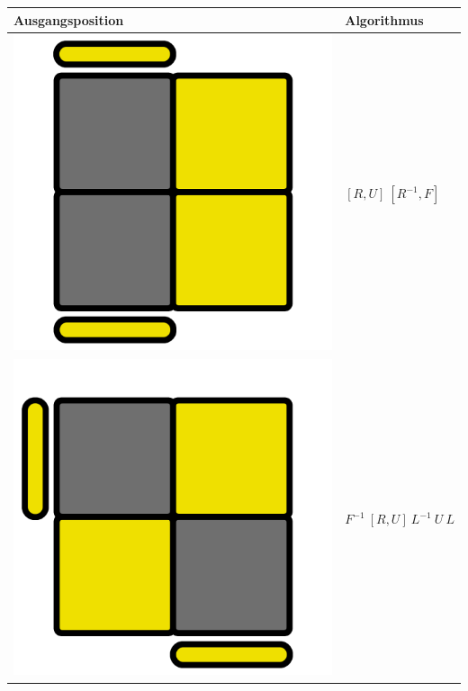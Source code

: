 \documentclass[12pt,a4paper, usenames, dvipsnames]{article}
\theoremstyle{mystyle}
\theoremstyle{definition}
\begin{document}
\begin{center}
\begin{tabular}{m{4cm} m{6cm}}
\toprule
Ausgangsposition & Algorithmus  \\
\midrule
\includegraphics[scale=0.08]{TOPVIEW5.png} & $[ R,U ] \ [R^{-1}, F]$ \\
\includegraphics[scale=0.08]{TOPVIEW6.png} & $F^{-1} \ [ R,U ]\ L^{-1} \ U \ L$ \\
\bottomrule
\end{tabular}
\end{center}
\end{document}
